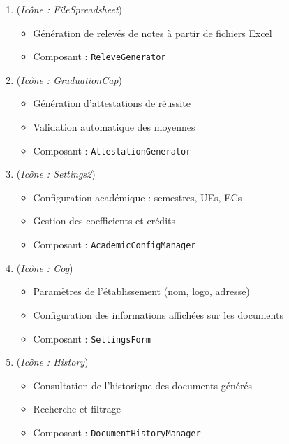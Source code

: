 \begin{enumerate}[leftmargin=*]
    \item {} (\textit{Icône : FileSpreadsheet})
    \begin{itemize}
        \item Génération de relevés de notes à partir de fichiers Excel
        \item Composant : \texttt{ReleveGenerator}
    \end{itemize}

    \item {} (\textit{Icône : GraduationCap})
    \begin{itemize}
        \item Génération d'attestations de réussite
        \item Validation automatique des moyennes
        \item Composant : \texttt{AttestationGenerator}
    \end{itemize}

    \item {} (\textit{Icône : Settings2})
    \begin{itemize}
        \item Configuration académique : semestres, UEs, ECs
        \item Gestion des coefficients et crédits
        \item Composant : \texttt{AcademicConfigManager}
    \end{itemize}

    \item {} (\textit{Icône : Cog})
    \begin{itemize}
        \item Paramètres de l'établissement (nom, logo, adresse)
        \item Configuration des informations affichées sur les documents
        \item Composant : \texttt{SettingsForm}
    \end{itemize}

    \item {} (\textit{Icône : History})
    \begin{itemize}
        \item Consultation de l'historique des documents générés
        \item Recherche et filtrage
        \item Composant : \texttt{DocumentHistoryManager}
    \end{itemize}


\end{enumerate}

